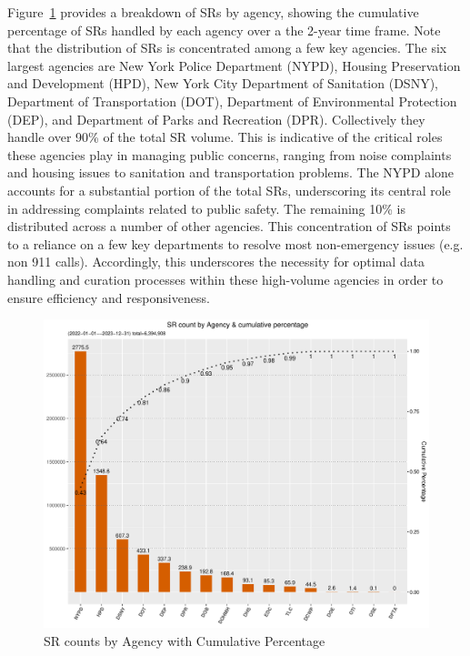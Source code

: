 \documentclass[linenumber]{jdsart}
\begin{document}
Figure~\ref{fig:SRcountbyAgency} provides a breakdown of SRs by
agency, showing the cumulative percentage of SRs handled by each
agency over a the 2-year time frame. Note that the
distribution of SRs is concentrated among a few key agencies. The six
largest agencies are New York Police Department (NYPD), 
Housing Preservation and Development (HPD),
New York City Department of Sanitation (DSNY), Department of
Transportation (DOT), Department of Environmental Protection (DEP),
and Department of Parks and Recreation (DPR).
Collectively they handle over 90\% of the total SR volume. This is
indicative of the critical roles these agencies play in managing
public concerns, ranging from noise complaints and housing issues to
sanitation and transportation problems. The NYPD alone accounts for a
substantial portion of the total SRs, underscoring its central role in
addressing complaints related to public safety. The
remaining 10\% is distributed across a number of other
agencies. This concentration of SRs points to a
reliance on a few key departments to resolve most non-emergency
issues (e.g. non 911 calls). Accordingly, this underscores 
the necessity for optimal data handling and curation processes 
within these high-volume agencies in order to ensure 
efficiency and responsiveness.


\begin{figure}[tbp]
	\centering
	\includegraphics[width = \textwidth]{SRs_by_Agency.pdf}
  	\caption{SR counts by Agency with Cumulative Percentage}
	\label{fig:SRcountbyAgency}
\end{figure}
\end{document}
